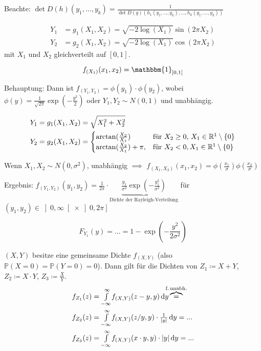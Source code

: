 \documentclass{cheat-sheet}
\renewcommand{\P}{\mathbb{P}} %
\newcommand{\ind}{\mathbbm{1}} %
\begin{document}
Beachte: $\det D(h)(y_1, ..., y_k) = \frac{1}{\det D(g)(h_1(y_1, ..., y_k), ..., h_k(y_1, ..., y_k))}$

\begin{bsp}

  \begin{align*}
    Y_1 &= g_1(X_1, X_2) = \sqrt{- 2 \log (X_1)} \sin(2 \pi X_2) \\
    Y_2 &= g_2(X_1, X_2) = \sqrt{- 2 \log (X_1)} \cos(2 \pi X_2)
  \end{align*}
  mit $X_1$ und $X_2$ gleichverteilt auf $[0,1]$.

  \[ f_{(X_1)}(x_1, x_2) = \ind_{\left] 0,1 \right[} \]

  Behauptung: Dann ist $f_{(Y_1, Y_2)} = \phi(y_1) \cdot \phi(y_2)$, wobei $\phi(y) = \frac{1}{\sqrt{2 \pi}} \exp(- \frac{y^2}{2})$ oder $Y_1, Y_2 \sim N(0, 1)$ und unabhängig.
\end{bsp}

\begin{bsp}
  \begin{align*}
    Y_1 &= g_1(X_1, X_2) = \sqrt{X_1^2 + X_2^2} \\
    Y_2 &= g_2(X_1, X_2) = \begin{cases} \arctan(\frac{X_2}{X_1}) & \text{für $X_2 \geq 0$, $X_1 \in \mathbb{R}^1 \setminus \{ 0 \}$} \\ \arctan(\frac{X_2}{X_1}) + \pi, & \text{für } X_2 < 0, X_1 \in \mathbb{R}^1 \setminus \{ 0 \} \end{cases}
  \end{align*}

  Wenn $X_1, X_2 \sim N(0, \sigma^2)$, unabhängig $\implies$ $f_{(X_1, X_2)}(x_1, x_2) = \phi(\frac{x_1}{\sigma}) \phi(\frac{x_2}{\sigma})$

  Ergebnis: $f_{(Y_1, Y_2)}(y_1, y_2) = \frac{1}{2 \pi} \cdot \underbrace{\frac{y_1}{\sigma^2} \exp(- \frac{y_1^2}{\sigma^2})}_{\text{Dichte der Rayleigh-Verteilung}}$ für $(y_1, y_2) \in \left] 0, \infty \right[ \times \left] 0, 2\pi \right]$

  \[ F_{Y_1}(y) = ... = 1 - \exp(- \frac{y^2}{2 \sigma^2}) \]
\end{bsp}




\begin{satz}
  $(X, Y)$ besitze eine gemeinsame Dichte $f_{(X, Y)}$ (also $\P(X = 0) = \P(Y = 0) = 0$). Dann gilt für die Dichten von $Z_1 \coloneqq X + Y$, $Z_2 \coloneqq X \cdot Y$, $Z_3 \coloneqq \tfrac{X}{Y}$.
  \begin{align*}
    f_{Z_1}(z) &= \Int{-\infty}{\infty}{f_{(X, Y)}(z - y, y)}{y} \overbrace{=}^{\mathclap{\text{f.\,unabh.}}} \\
    f_{Z_2}(z) &= \Int{-\infty}{\infty}{f_{(X, Y)}(z/y, y) \cdot \tfrac{1}{\abs{y}}}{y} = ... \\
    f_{Z_3}(z) &= \Int{-\infty}{\infty}{f_{(X, Y)}(x \cdot y, y) \cdot \abs{y}}{y} = ...
  \end{align*}
\end{satz}
\end{document}
